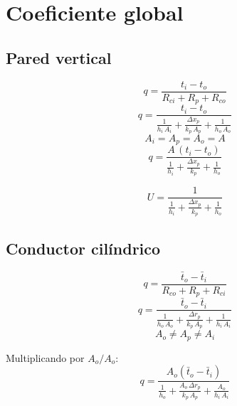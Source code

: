 \section{Coeficiente global}

\subsection{Pared vertical}


\begin{equation*}
    q = \frac{t_i - t_o}{R_{ci} + R_p + R_{co}}
\end{equation*}
\begin{equation*}
    q = \dfrac{t_i - t_o}{\frac{1}{h_i\,A_i} + \frac{\Delta x_p}{k_p\,A_p} + \frac{1}{h_o\,A_o}}
\end{equation*}
\begin{equation*}
    A_i = A_p = A_o = A
\end{equation*}
\begin{equation*}
    q = \dfrac{A\,(t_i - t_o)}{\frac{1}{h_i} + \frac{\Delta x_p}{k_p} + \frac{1}{h_o}}
\end{equation*}

\begin{equation}
    U = \dfrac{1}{\frac{1}{h_i} + \frac{\Delta x_p}{k_p} + \frac{1}{h_o}}
\end{equation}

\subsection{Conductor cilíndrico}


\begin{equation*}
    q = \frac{\bar{t}_o - \bar{t}_i}{R_{co} + R_p + R_{ci}}
\end{equation*}
\begin{equation*}
    q = \dfrac{\bar{t}_o - \bar{t}_i}{\frac{1}{h_o\,A_o} + \frac{\Delta r_p}{k_p\,A_p} + \frac{1}{h_i\,A_i}}
\end{equation*}
\begin{equation*}
    A_o \neq A_p \neq A_i
\end{equation*}

Multiplicando por $A_o/A_o$:
\begin{equation*}
    q = \dfrac{A_o(\bar{t}_o - \bar{t}_i)}{\frac{1}{h_o} + \frac{A_o\,\Delta r_p}{k_p\,A_p} + \frac{A_o}{h_i\,A_i}}
\end{equation*}

